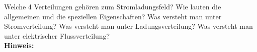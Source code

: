 \begin{question}[section=2,subsection=21,name={Strom-Ladungsfeld},difficulty=9,type=mdl,mode=exm,tags={}]
	Welche 4 Verteilungen gehören zum Stromladungsfeld? Wie lauten die allgemeinen und die speziellen Eigenschaften? Was versteht man unter Stromverteilung? Was versteht man unter Ladungsverteilung? Was versteht man unter elektrischer Flussverteilung?
	\\ \textbf{Hinweis:}\\
	
\end{question}
\begin{solution}
	
\end{solution}